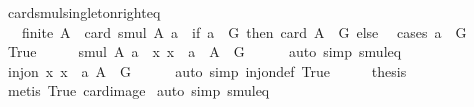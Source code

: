 \begin{isabellebody}
\ card{\isacharunderscore}{\kern0pt}smul{\isacharunderscore}{\kern0pt}singleton{\isacharunderscore}{\kern0pt}right{\isacharunderscore}{\kern0pt}eq{\isacharcolon}{\kern0pt}\isanewline
\ \ \ {\isachardoublequoteopen}finite\ A{\isachardoublequoteclose}\ \ {\isachardoublequoteopen}card\ {\isacharparenleft}{\kern0pt}smul\ A\ {\isacharbraceleft}{\kern0pt}a{\isacharbraceright}{\kern0pt}{\isacharparenright}{\kern0pt}\ {\isacharequal}{\kern0pt}\ {\isacharparenleft}{\kern0pt}if\ a\ {\isasymin}\ G\ then\ card\ {\isacharparenleft}{\kern0pt}A\ {\isasyminter}\ G{\isacharparenright}{\kern0pt}\ else\ {}{\isacharparenright}{\kern0pt}{\isachardoublequoteclose}\isanewline
%
\isadelimproof
%
\endisadelimproof
%
\isatagproof
{}\isamarkupfalse%
\ {\isacharparenleft}{\kern0pt}cases\ {\isachardoublequoteopen}a\ {\isasymin}\ G{\isachardoublequoteclose}{\isacharparenright}{\kern0pt}\isanewline
\ \ \isamarkupfalse%
\ True\isanewline
\ \ \isamarkupfalse%
\ \isamarkupfalse%
\ {\isachardoublequoteopen}smul\ A\ {\isacharbraceleft}{\kern0pt}a{\isacharbraceright}{\kern0pt}\ {\isacharequal}{\kern0pt}\ {\isacharparenleft}{\kern0pt}{\isasymlambda}x{\isachardot}{\kern0pt}\ x\ {\isasymcdot}\ a{\isacharparenright}{\kern0pt}\ {\isacharbackquote}{\kern0pt}\ {\isacharparenleft}{\kern0pt}A\ {\isasyminter}\ G{\isacharparenright}{\kern0pt}{\isachardoublequoteclose}\isanewline
\ \ \ \ \isamarkupfalse%
\ {\isacharparenleft}{\kern0pt}auto\ simp{\isacharcolon}{\kern0pt}\ smul{\isacharunderscore}{\kern0pt}eq{\isacharparenright}{\kern0pt}\isanewline
\ \ \isamarkupfalse%
\ \isamarkupfalse%
\ {\isachardoublequoteopen}inj{\isacharunderscore}{\kern0pt}on\ {\isacharparenleft}{\kern0pt}{\isasymlambda}x{\isachardot}{\kern0pt}\ x\ {\isasymcdot}\ a{\isacharparenright}{\kern0pt}\ {\isacharparenleft}{\kern0pt}A\ {\isasyminter}\ G{\isacharparenright}{\kern0pt}{\isachardoublequoteclose}\isanewline
\ \ \ \ \isamarkupfalse%
\ {\isacharparenleft}{\kern0pt}auto\ simp{\isacharcolon}{\kern0pt}\ inj{\isacharunderscore}{\kern0pt}on{\isacharunderscore}{\kern0pt}def\ True{\isacharparenright}{\kern0pt}\isanewline
\ \ \isamarkupfalse%
\ \isamarkupfalse%
\ {\isacharquery}{\kern0pt}thesis\isanewline
\ \ \ \ \isamarkupfalse%
\ {\isacharparenleft}{\kern0pt}metis\ True\ card{\isacharunderscore}{\kern0pt}image{\isacharparenright}{\kern0pt}\isanewline
{}\isamarkupfalse%
\ {\isacharparenleft}{\kern0pt}auto\ simp{\isacharcolon}{\kern0pt}\ smul{\isacharunderscore}{\kern0pt}eq{\isacharparenright}{\kern0pt}%

\end{isabellebody}
